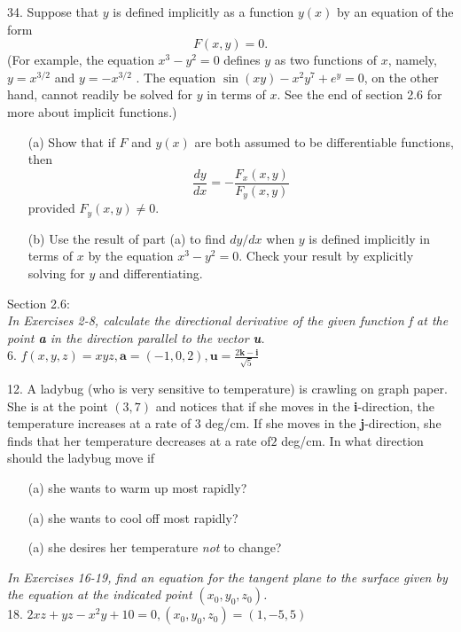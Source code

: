 \documentclass[12pt,letterpaper]{hmcpset}
\begin{document}
\begin{problem}
34. Suppose that $y$ is defined implicitly as a function $y(x)$
by an equation of the form
\begin{equation}
    F(x, y) = 0.
\end{equation}
(For example, the equation $x^3 - y^2 = 0$ defines $y$ as
two functions of $x$, namely, $y = x^{3/2}$ and $y = -x^{3/2}$ .
The equation $\sin(xy) - x^2y^7 + e^y = 0$, on the other
hand, cannot readily be solved for $y$ in terms of $x$. See
the end of section 2.6 for more about implicit functions.)

\begin{enumerate}
    \item[(a)] Show that if $F$ and $y(x)$ are both assumed to be
differentiable functions, then
\begin{equation}
    \frac{dy}{dx}=-\frac{F_x(x,y)}{F_y(x,y)}
\end{equation}
provided $F_y(x,y)\neq0$.

    \item[(b)] Use the result of part (a) to find $dy/dx$ when $y$
is defined implicitly in terms of $x$ by the equation $x^3 - y^2 = 0$. Check your result by explicitly
solving for $y$ and differentiating.
\end{enumerate}
\end{problem}

\newpage


\begin{problem}
Section 2.6:
\\
\textit{In Exercises 2-8, calculate the directional derivative of the
given function f at the point \textbf{a} in the direction parallel to the
vector \textbf{u}.}
\\
6. $ f (x, y, z) = xyz, \mathbf{a} = (-1, 0, 2), \mathbf{u}=\frac{2\mathbf{k}-\mathbf{i}}{\sqrt{5}}$
\end{problem}

\newpage


\begin{problem}
12. A ladybug (who is very sensitive to temperature) is
crawling on graph paper. She is at the point $(3, 7)$ and
notices that if she moves in the \textbf{i}-direction, the temperature increases at a rate of $3$ deg/cm. If she moves
in the \textbf{j}-direction, she finds that her temperature decreases at a rate of$2$ deg/cm. In what direction should
the ladybug move if
\begin{enumerate}
    \item[(a)] she wants to warm up most rapidly?
    \item[(a)] she wants to cool off most rapidly? 
    \item[(a)] she desires her temperature \textit{not} to change? 
\end{enumerate}
\end{problem}

\newpage


\begin{problem}
\textit{In Exercises 16-19, find an equation for the tangent plane to
the surface given by the equation at the indicated point $(x_0, y_0,
z_0)$.}
\\
18. $2xz + yz - x^2 y + 10 = 0, (x_0 , y_0 , z_0 ) = (1, -5, 5)$
\end{problem}
\end{document}
